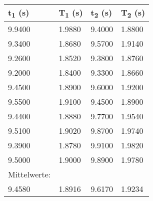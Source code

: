 \documentclass[titlepage=firstcover, captions=tableheading]{scrartcl}
\begin{document}
    \begin{minipage}{\linewidth}
        \centering
    \begin{tabular}{llll}
        \toprule
        t\textsubscript{1} (s) & T\textsubscript{1} (s) & t\textsubscript{2} (s) & T\textsubscript{2} (s) \\
        \midrule
        9.9400  &    1.9880  & 9.4000 & 1.8800 \\
        9.3400  &    1.8680  & 9.5700 & 1.9140 \\
        9.2600  &    1.8520  & 9.3800 & 1.8760 \\
        9.2000  &    1.8400  & 9.3300 & 1.8660 \\
        9.4500  &    1.8900  & 9.6000 & 1.9200 \\
        9.5500  &    1.9100  & 9.4500 & 1.8900 \\
        9.4400  &    1.8880  & 9.7700 & 1.9540 \\
        9.5100  &    1.9020  & 9.8700 & 1.9740 \\
        9.3900  &    1.8780  & 9.9100 & 1.9820 \\
        9.5000  &    1.9000  & 9.8900 & 1.9780 \\
        \midrule
        Mittelwerte:\\
        9.4580 & 1.8916 & 9.6170 & 1.9234  \\
        \bottomrule
        
    \end{tabular}
    \label{tab:1}
\end{minipage}
\end{document}

